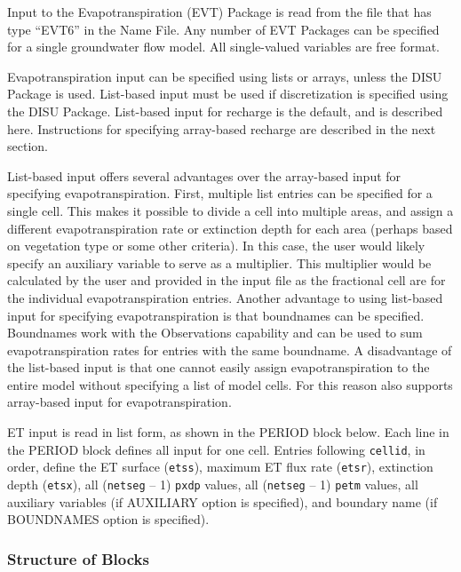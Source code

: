 Input to the Evapotranspiration (EVT) Package is read from the file that has type ``EVT6'' in the Name File. Any number of EVT Packages can be specified for a single groundwater flow model. All single-valued variables are free format.

Evapotranspiration input can be specified using lists or arrays, unless the DISU Package is used.  List-based input must be used if discretization is specified using the DISU Package.  List-based input for recharge is the default, and is described here.  Instructions for specifying array-based recharge are described in the next section. 

List-based input offers several advantages over the array-based input for specifying evapotranspiration.  First, multiple list entries can be specified for a single cell.  This makes it possible to divide a cell into multiple areas, and assign a different evapotranspiration rate or extinction depth for each area (perhaps based on vegetation type or some other criteria).  In this case, the user would likely specify an auxiliary variable to serve as a multiplier.  This multiplier would be calculated by the user and provided in the input file as the fractional cell are for the individual evapotranspiration entries.  Another advantage to using list-based input for specifying evapotranspiration is that boundnames can be specified.  Boundnames work with the Observations capability and can be used to sum evapotranspiration rates for entries with the same boundname.  A disadvantage of the list-based input is that one cannot easily assign evapotranspiration to the entire model without specifying a list of model cells.  For this reason \mf also supports array-based input for evapotranspiration.

ET input is read in list form, as shown in the PERIOD block below. Each line in the PERIOD block defines all input for one cell. Entries following \texttt{cellid}, in order, define the ET surface (\texttt{etss}), maximum ET flux rate (\texttt{etsr}), extinction depth (\texttt{etsx}), all (\texttt{netseg} -- 1) \texttt{pxdp} values, all (\texttt{netseg} -- 1) \texttt{petm} values, all auxiliary variables (if AUXILIARY option is specified), and boundary name (if BOUNDNAMES option is specified).

\vspace{5mm}
\subsubsection{Structure of Blocks}
\vspace{5mm}

